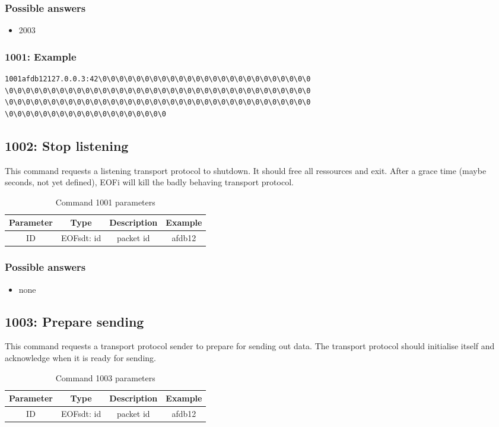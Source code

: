 \subsubsection{Possible answers}
\begin{itemize}
\item 2003
\end{itemize}
\subsubsection{1001: Example}
\begin{verbatim}
1001afdb12127.0.0.3:42\0\0\0\0\0\0\0\0\0\0\0\0\0\0\0\0\0\0\0\0\0\0\0\0\0
\0\0\0\0\0\0\0\0\0\0\0\0\0\0\0\0\0\0\0\0\0\0\0\0\0\0\0\0\0\0\0\0\0\0\0\0
\0\0\0\0\0\0\0\0\0\0\0\0\0\0\0\0\0\0\0\0\0\0\0\0\0\0\0\0\0\0\0\0\0\0\0\0
\0\0\0\0\0\0\0\0\0\0\0\0\0\0\0\0\0\0\0
\end{verbatim}
\subsection{1002: Stop listening}
%
This command requests a listening transport protocol to shutdown.
It should free all ressources and exit. After a grace time (maybe seconds,
not yet defined), EOFi will kill the badly behaving transport protocol.
\begin{longtable}{|c|c|c|c|}
\caption{Command 1001 parameters}\\
\hline
\textbf{Parameter} & \textbf{Type} & \textbf{Description} & \textbf{Example}\\
\hline
ID & EOFsdt: id & packet id & afdb12\\
\hline
\end{longtable}
\subsubsection{Possible answers}
\begin{itemize}
\item none
\end{itemize}
\subsection{1003: Prepare sending}
%
This command requests a transport protocol sender to prepare for sending out
data. The transport protocol should initialise itself and acknowledge
when it is ready for sending.
\begin{longtable}{|c|c|c|c|}
\caption{Command 1003 parameters}\\
\hline
\textbf{Parameter} & \textbf{Type} & \textbf{Description} & \textbf{Example}\\
\hline
ID & EOFsdt: id & packet id & afdb12\\
\hline
\end{longtable}
